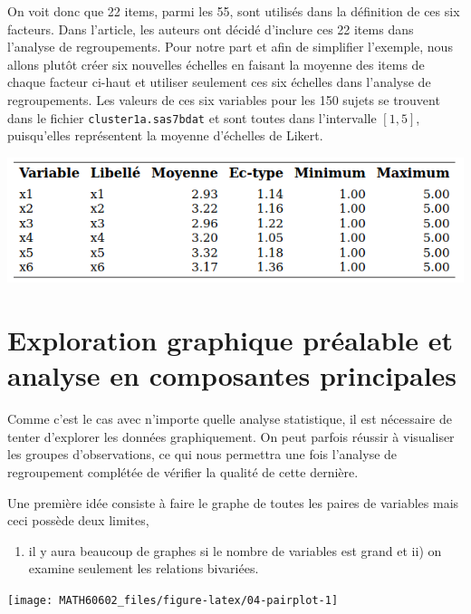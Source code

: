 \documentclass[
  11pt,
  letterpaper,
]{book}
\providecommand{\tightlist}{%
  \setlength{\itemsep}{0pt}\setlength{\parskip}{0pt}}
\theoremstyle{definition}
\theoremstyle{definition}
\theoremstyle{definition}
\theoremstyle{remark}
\begin{document}
On voit donc que 22 items, parmi les 55, sont utilisés dans la définition de ces six facteurs. Dans l'article, les auteurs ont décidé d'inclure ces 22 items dans l'analyse de regroupements. Pour notre part et afin de simplifier l'exemple, nous allons plutôt créer six nouvelles échelles en faisant la moyenne des items de chaque facteur ci-haut et utiliser seulement ces six échelles dans l'analyse de regroupements. Les valeurs de ces six variables pour les 150 sujets se trouvent dans le fichier \texttt{cluster1a.sas7bdat} et sont toutes dans l'intervalle \([1,5]\), puisqu'elles représentent la moyenne d'échelles de Likert.

\begin{center}\includegraphics[width=0.8\linewidth]{figures/04-clustering-e1} \end{center}

\hypertarget{exploration-graphique-pruxe9alable-et-analyse-en-composantes-principales}{%
\section{Exploration graphique préalable et analyse en composantes principales}\label{exploration-graphique-pruxe9alable-et-analyse-en-composantes-principales}}

Comme c'est le cas avec n'importe quelle analyse statistique, il est nécessaire de tenter d'explorer les données graphiquement. On peut parfois réussir à visualiser les groupes d'observations, ce qui nous permettra une fois l'analyse de regroupement complétée de vérifier la qualité de cette dernière.

Une première idée consiste à faire le graphe de toutes les paires de variables mais ceci possède deux limites,

\begin{enumerate}
\def\labelenumi{\roman{enumi})}
\tightlist
\item
  il y aura beaucoup de graphes si le nombre de variables est grand et ii) on examine seulement les relations bivariées.
\end{enumerate}

\begin{center}\texttt{[image: MATH60602\_files/figure-latex/04-pairplot-1]} \end{center}
\end{document}
